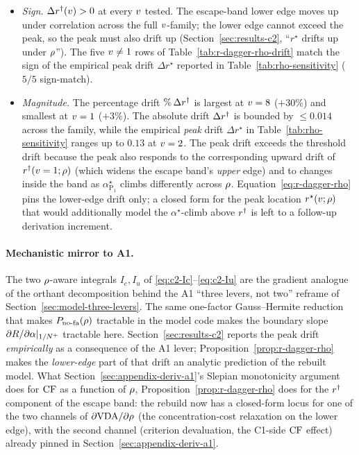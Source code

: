 \begin{itemize}
  \item \emph{Sign.} $\Delta r^{\dagger}(v) > 0$ at every $v$
  tested. The escape-band lower edge moves up under correlation
  across the full $v$-family; the lower edge cannot
  exceed the peak, so the peak must also drift up
  (Section~\ref{sec:results-c2}, ``$r^\star$ drifts up under
  $\rho$''). The five $v \ne 1$ rows of
  Table~\ref{tab:r-dagger-rho-drift} match the sign of the empirical
  peak drift $\Delta r^\star$ reported in
  Table~\ref{tab:rho-sensitivity} ($5/5$ sign-match).
  \item \emph{Magnitude.} The percentage drift $\%\,\Delta r^{\dagger}$
  is largest at $v = 8$ ($+30\%$) and smallest at $v = 1$
  ($+3\%$). The absolute drift $\Delta r^{\dagger}$ is bounded by
  $\le 0.014$ across the family, while the empirical \emph{peak}
  drift $\Delta r^\star$ in Table~\ref{tab:rho-sensitivity}
  ranges up to $0.13$ at $v = 2$. The peak drift exceeds the
  threshold drift because the peak also responds to the
  corresponding upward drift of $r^{\dagger}(v = 1; \rho)$ (which
  widens the escape band's \emph{upper} edge) and to changes inside
  the band as $\alpha^\star_{\mathrm{P_1}}$ climbs differently
  across $\rho$. Equation~\eqref{eq:r-dagger-rho} pins the
  lower-edge drift only; a closed form for the peak location
  $r^\star(v;\rho)$ that would additionally model the
  $\alpha^\star$-climb above $r^{\dagger}$ is left to a follow-up
  derivation increment.
\end{itemize}

\paragraph{Mechanistic mirror to A1.}
The two $\rho$-aware integrals $I_c, I_u$ of
\eqref{eq:c2-Ic}--\eqref{eq:c2-Iu} are the gradient analogue of
the orthant decomposition behind the A1 ``three levers, not two''
reframe of Section~\ref{sec:model-three-levers}. The same
one-factor Gauss--Hermite reduction that makes $P_{\mathrm{no\text{-}fa}}(\rho)$
tractable in the model code makes the boundary slope
$\partial R/\partial\alpha|_{1/N^{+}}$ tractable here.
Section~\ref{sec:results-c2} reports the peak drift
\emph{empirically} as a consequence of the A1 lever;
Proposition~\ref{prop:r-dagger-rho} makes the
\emph{lower-edge} part of that drift an analytic prediction of
the rebuilt model. What
Section~\ref{sec:appendix-deriv-a1}'s Slepian monotonicity argument
does for $\mathrm{CF}$ as a function of $\rho$,
Proposition~\ref{prop:r-dagger-rho} does for the
$r^{\dagger}$ component of the escape band: the rebuild now has a
closed-form locus for one of the two channels of
$\partial\mathrm{VDA}/\partial\rho$ (the concentration-cost relaxation
on the lower edge), with the second channel (criterion
devaluation, the C1-side $\mathrm{CF}$ effect) already pinned in
Section~\ref{sec:appendix-deriv-a1}.

